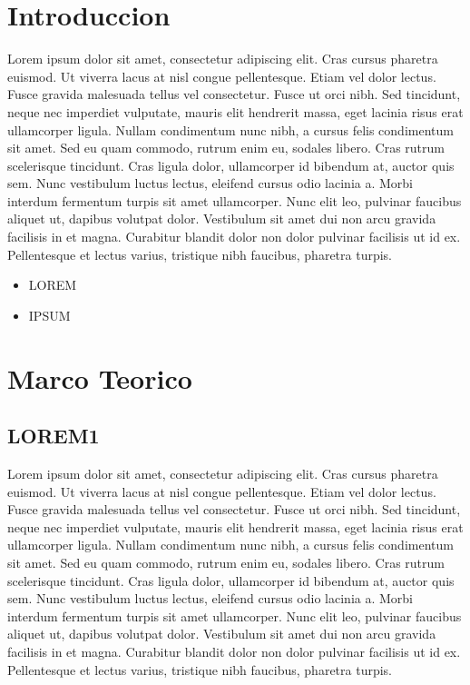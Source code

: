 \documentclass[preprint,12pt]{elsarticle}
\begin{document}
\section{Introduccion}
Lorem ipsum dolor sit amet, consectetur adipiscing elit. Cras cursus pharetra euismod. Ut viverra lacus at nisl congue pellentesque. Etiam vel dolor lectus. Fusce gravida malesuada tellus vel consectetur. Fusce ut orci nibh. Sed tincidunt, neque nec imperdiet vulputate, mauris elit hendrerit massa, eget lacinia risus erat ullamcorper ligula. Nullam condimentum nunc nibh, a cursus felis condimentum sit amet. Sed eu quam commodo, rutrum enim eu, sodales libero. Cras rutrum scelerisque tincidunt. Cras ligula dolor, ullamcorper id bibendum at, auctor quis sem. Nunc vestibulum luctus lectus, eleifend cursus odio lacinia a. Morbi interdum fermentum turpis sit amet ullamcorper. Nunc elit leo, pulvinar faucibus aliquet ut, dapibus volutpat dolor. Vestibulum sit amet dui non arcu gravida facilisis in et magna. Curabitur blandit dolor non dolor pulvinar facilisis ut id ex. Pellentesque et lectus varius, tristique nibh faucibus, pharetra turpis.
\begin{itemize}
		\item LOREM
		\item IPSUM
	\end{itemize}

	

\section{Marco Teorico}
	
\subsection{LOREM1}	

Lorem ipsum dolor sit amet, consectetur adipiscing elit. Cras cursus pharetra euismod. Ut viverra lacus at nisl congue pellentesque. Etiam vel dolor lectus. Fusce gravida malesuada tellus vel consectetur. Fusce ut orci nibh. Sed tincidunt, neque nec imperdiet vulputate, mauris elit hendrerit massa, eget lacinia risus erat ullamcorper ligula. Nullam condimentum nunc nibh, a cursus felis condimentum sit amet. Sed eu quam commodo, rutrum enim eu, sodales libero. Cras rutrum scelerisque tincidunt. Cras ligula dolor, ullamcorper id bibendum at, auctor quis sem. Nunc vestibulum luctus lectus, eleifend cursus odio lacinia a. Morbi interdum fermentum turpis sit amet ullamcorper. Nunc elit leo, pulvinar faucibus aliquet ut, dapibus volutpat dolor. Vestibulum sit amet dui non arcu gravida facilisis in et magna. Curabitur blandit dolor non dolor pulvinar facilisis ut id ex. Pellentesque et lectus varius, tristique nibh faucibus, pharetra turpis.
\end{document}
